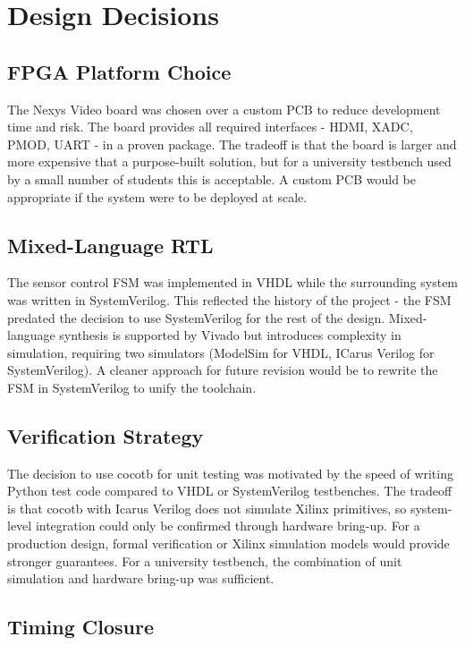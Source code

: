 \section{Design Decisions}

\subsection{FPGA Platform Choice}

The Nexys Video board was chosen over a custom PCB to reduce development time and risk. The board provides all required interfaces - HDMI, XADC, PMOD, UART - in a proven package. The tradeoff is that the board is larger and more expensive that a purpose-built solution, but for a university testbench used by a small number of students this is acceptable. A custom PCB would be appropriate if the system were to be deployed at scale. 

\subsection{Mixed-Language RTL}

The sensor control FSM was implemented in VHDL while the surrounding system was written in SystemVerilog. This reflected the history of the project - the FSM predated the decision to use SystemVerilog for the rest of the design. Mixed-language synthesis is supported by Vivado but introduces complexity in simulation, requiring two simulators (ModelSim for VHDL, ICarus Verilog for SystemVerilog). A cleaner approach for future revision would be to rewrite the FSM in SystemVerilog to unify the toolchain.

\subsection{Verification Strategy}

The decision to use cocotb for unit testing was motivated by the speed of writing Python test code compared to VHDL or SystemVerilog testbenches. The tradeoff is that cocotb with Icarus Verilog does not simulate Xilinx primitives, so system-level integration could only be confirmed through hardware bring-up. For a production design, formal verification or Xilinx simulation models would provide stronger guarantees. For a university testbench, the combination of unit simulation and hardware bring-up was sufficient.

\subsection{Timing Closure}

